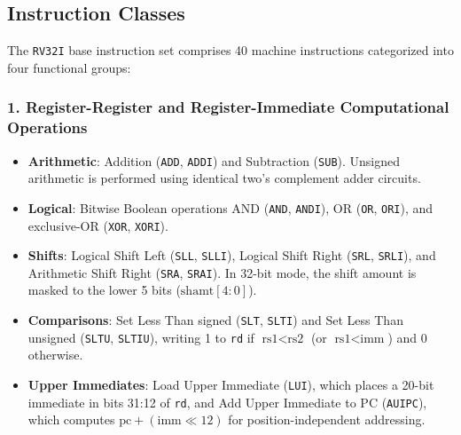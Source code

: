 \subsection{Instruction Classes}

The \texttt{RV32I} base instruction set comprises 40 machine instructions categorized into four functional groups:

\subsubsection{1. Register-Register and Register-Immediate Computational Operations}
\begin{itemize}
    \item \textbf{Arithmetic}: Addition (\texttt{ADD}, \texttt{ADDI}) and Subtraction (\texttt{SUB}). Unsigned arithmetic is performed using identical two's complement adder circuits.
    \item \textbf{Logical}: Bitwise Boolean operations AND (\texttt{AND}, \texttt{ANDI}), OR (\texttt{OR}, \texttt{ORI}), and exclusive-OR (\texttt{XOR}, \texttt{XORI}).
    \item \textbf{Shifts}: Logical Shift Left (\texttt{SLL}, \texttt{SLLI}), Logical Shift Right (\texttt{SRL}, \texttt{SRLI}), and Arithmetic Shift Right (\texttt{SRA}, \texttt{SRAI}). In 32-bit mode, the shift amount is masked to the lower 5 bits ($\text{shamt}[4:0]$).
    \item \textbf{Comparisons}: Set Less Than signed (\texttt{SLT}, \texttt{SLTI}) and Set Less Than unsigned (\texttt{SLTU}, \texttt{SLTIU}), writing 1 to \texttt{rd} if $\text{rs1} < \text{rs2}$ (or $\text{rs1} < \text{imm}$) and 0 otherwise.
    \item \textbf{Upper Immediates}: Load Upper Immediate (\texttt{LUI}), which places a 20-bit immediate in bits 31:12 of \texttt{rd}, and Add Upper Immediate to PC (\texttt{AUIPC}), which computes $\text{pc} + (\text{imm} \ll 12)$ for position-independent addressing.
\end{itemize}

